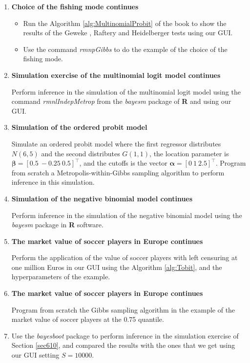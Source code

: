 \begin{enumerate}
	\item \textbf{Choice of the fishing mode continues} 
	
	\begin{itemize}
		\item Run the Algorithm \ref{alg:MultinomialProbit} of the book to show the results of the Geweke \cite{Geweke1992}, Raftery \cite{Raftery1992} and Heidelberger \cite{Heidelberger1983} tests using our GUI.
		\item Use the command \textit{rmnpGibbs} to do the example of the choice of the fishing mode. 
	\end{itemize}
	
	
	\item \textbf{Simulation exercise of the multinomial logit model continues}
	
	Perform inference in the simulation of the multinomial logit model using the command \textit{rmnlIndepMetrop} from the \textit{bayesm} package of \textbf{R} and using our GUI.
	
	\item \textbf{Simulation of the ordered probit model}
	
	Simulate an ordered probit model where the first regressor distributes $N(6, 5)$ and the second distributes $G(1,1)$, the location parameter is $\bm{\beta}=\left[0.5 \ -0.25 \ 0.5\right]^{\top}$, and the cutoffs is the vector $\bm{\alpha}=\left[0 \ 1 \ 2.5\right]^{\top}$. Program from scratch a Metropolis-within-Gibbs sampling algorithm to perform inference in this simulation.
	
	\item \textbf{Simulation of the negative binomial model continues}
	
	Perform inference in the simulation of the negative binomial model using the \textit{bayesm} package in \textbf{R} software.
	
	\item \textbf{The market value of soccer players in Europe continues}
	
	Perform the application of the value of soccer players with left censuring at one million Euros in our GUI using the Algorithm \ref{alg:Tobit}, and the hyperparameters of the example.
	
	\item \textbf{The market value of soccer players in Europe continues}
	
	Program from scratch the Gibbs sampling algorithm in the example of the market value of soccer players at the 0.75 quantile.
	
	\item Use the \textit{bayesboot} package to perform inference in the simulation exercise of Section \ref{sec610}, and compared the results with the ones that we get using our GUI setting $S=10000$.    

\end{enumerate}
